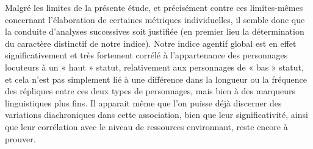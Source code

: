 Malgré les limites de la présente étude, et précisément contre ces limites-mêmes concernant l’élaboration de certaines métriques individuelles, il semble donc que la conduite d’analyses successives soit justifiée (en premier lieu la détermination du caractère distinctif de notre indice). Notre indice agentif global est en effet significativement et très fortement corrélé à l’appartenance des personnages locuteurs à un « haut » statut, relativement aux personnages de  « bas » statut, et cela n'est pas simplement lié à une différence dans la longueur ou la fréquence des répliques entre ces deux types de personnages, mais bien à des marqueurs linguistiques plus fins. Il apparait même que l’on puisse déjà discerner des variations diachroniques dans cette association, bien que leur significativité, ainsi que leur corrélation avec le niveau de ressources environnant, reste encore à prouver.  